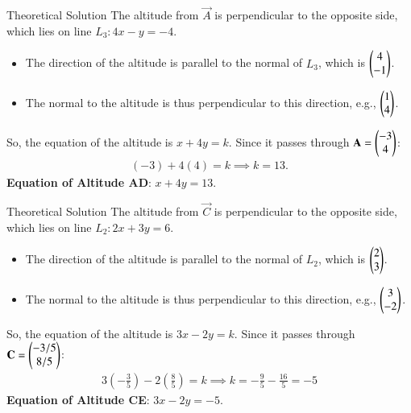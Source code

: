 \documentclass{beamer}
\begin{document}
\begin{frame}{Theoretical Solution}
The altitude from $\vec{A}$ is perpendicular to the opposite side, which lies on line $L_3: 4x-y=-4$.
\begin{itemize}
    \item The direction of the altitude is parallel to the normal of $L_3$, which is $\begin{pmatrix}4 \\ -1\end{pmatrix}$.
    \item The normal to the altitude is thus perpendicular to this direction, e.g., $\begin{pmatrix}1 \\ 4\end{pmatrix}$.
\end{itemize}
\bigskip
So, the equation of the altitude is $x+4y=k$.
\bigskip
Since it passes through $\mathbf{A}=\begin{pmatrix}-3 \\ 4\end{pmatrix}$:
\begin{align}
    (-3)+4(4)=k \implies k=13.
\end{align}
\textbf{Equation of Altitude AD}: $x+4y = 13$.
\end{frame}

\begin{frame}{Theoretical Solution}
The altitude from $\vec{C}$ is perpendicular to the opposite side, which lies on line $L_2: 2x+3y=6$.
\begin{itemize}
    \item The direction of the altitude is parallel to the normal of $L_2$, which is $\begin{pmatrix}2 \\ 3\end{pmatrix}$.
    \item The normal to the altitude is thus perpendicular to this direction, e.g., $\begin{pmatrix}3 \\ -2\end{pmatrix}$.
\end{itemize}
\bigskip
So, the equation of the altitude is $3x-2y=k$.
\bigskip
Since it passes through $\mathbf{C}=\begin{pmatrix}-3/5 \\ 8/5\end{pmatrix}$:
\begin{align}
    3(-\tfrac{3}{5})-2(\tfrac{8}{5})=k \implies k = -\frac{9}{5}-\frac{16}{5} = -5
\end{align}
\textbf{Equation of Altitude CE}: $3x-2y=-5$.
\end{frame}
\end{document}
